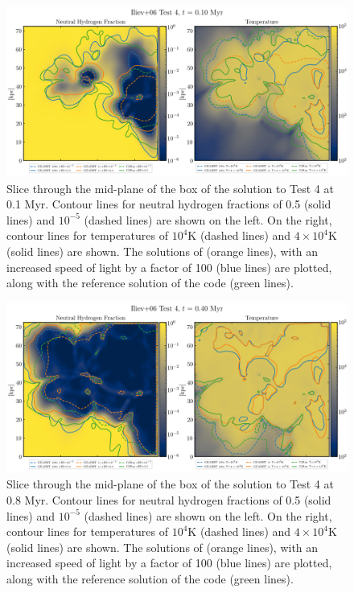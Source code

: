 \begin{figure}
 \centering
 \includegraphics[width=\textwidth]{figures/RHD/Iliev4/comparisonContour_output_0002.png}
 \caption{
Slice through the mid-plane of the box of the solution to Test 4 at 0.1 Myr.
Contour lines for neutral hydrogen fractions of 0.5 (solid lines) and $10^{-5}$ (dashed lines) are
shown on the left. On the right, contour lines for temperatures of $10^4$K (dashed lines) and $4
\times 10^4$K (solid lines) are shown. The solutions of \GEARRT (orange lines), \GEARRT with an
increased speed of light by a factor of 100 (blue lines) are plotted, along with the reference
solution of the  code (green lines).
}
 \label{fig:iliev4-0.1Myr}
\end{figure}



\begin{figure}
 \centering
 \includegraphics[width=\textwidth]{figures/RHD/Iliev4/comparisonContour_output_0008.png}
\caption{
Slice through the mid-plane of the box of the solution to Test 4 at 0.8 Myr.
Contour lines for neutral hydrogen fractions of 0.5 (solid lines) and $10^{-5}$ (dashed lines) are
shown on the left. On the right, contour lines for temperatures of $10^4$K (dashed lines) and $4
\times 10^4$K (solid lines) are shown. The solutions of \GEARRT (orange lines), \GEARRT with an
increased speed of light by a factor of 100 (blue lines) are plotted, along with the reference
solution of the  code (green lines).
}
 \label{fig:iliev4-0.4Myr}
\end{figure}


